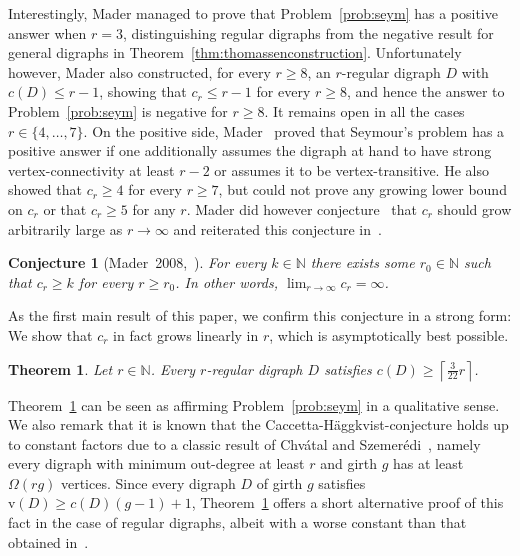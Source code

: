 \documentclass[a4paper,10pt]{article}
\newtheorem{theorem}{Theorem}
\newtheorem{conjecture}{Conjecture}
\begin{document}
Interestingly, Mader managed to prove that Problem~\ref{prob:seym} has a positive answer when $r=3$, distinguishing regular digraphs from the negative result for general digraphs in Theorem~\ref{thm:thomassenconstruction}. Unfortunately however, Mader also constructed, for every $r\ge 8$, an $r$-regular digraph $D$ with $c(D)\le r-1$, showing that $c_r\le r-1$ for every $r\ge 8$, and hence the answer to Problem~\ref{prob:seym} is negative for $r\ge 8$. It remains open in all the cases $r\in \{4,\ldots,7\}$. On the positive side, Mader~\cite{MR2588727,MR2672214} proved that Seymour's problem has a positive answer if one additionally assumes the digraph at hand to have strong vertex-connectivity at least $r-2$ or assumes it to be vertex-transitive. He also showed that $c_r\ge 4$ for every $r\ge 7$, but could not prove any growing lower bound on $c_r$ or that $c_r\ge 5$ for any $r$. Mader did however conjecture~\cite{MR2588727} that $c_r$ should grow arbitrarily large as $r\rightarrow \infty$ and reiterated this conjecture in~\cite{MR2672214}. 

\begin{conjecture}[Mader~2008,~\cite{MR2588727}]
For every $k\in\mathbb{N}$ there exists some $r_0\in\mathbb{N}$ such that $c_r\ge k$ for every $r\ge r_0$. In other words, $\lim_{r\rightarrow\infty}c_r=\infty$.
\end{conjecture}
As the first main result of this paper, we confirm this conjecture in a strong form: We show that $c_r$ in fact grows linearly in $r$, which is asymptotically best possible.
\begin{theorem}\label{thm:main}
Let $r\in\mathbb{N}$. Every $r$-regular digraph $D$ satisfies $c(D)\ge \left\lceil\frac{3}{22} r\right\rceil$. 
\end{theorem}
Theorem~\ref{thm:main} can be seen as affirming Problem~\ref{prob:seym} in a qualitative sense. We also remark that it is known that the Caccetta-H\"{a}ggkvist-conjecture holds up to constant factors due to a classic result of Chv\'{a}tal and Szemer\'{e}di~\cite{MR735200}, namely every digraph with minimum out-degree at least $r$ and girth $g$ has at least $\Omega(rg)$ vertices. Since every digraph $D$ of girth $g$ satisfies $\mathrm{v}(D)\ge c(D)(g-1)+1$, Theorem~\ref{thm:main} offers a short alternative proof of this fact in the case of regular digraphs, albeit with a worse constant than that obtained in~\cite{MR735200}.
\end{document}
